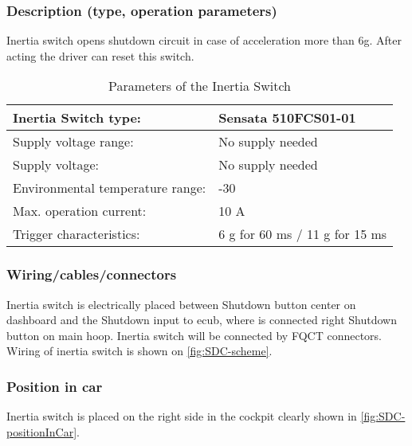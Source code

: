 \subsubsection{Description (type, operation parameters)}
\iffalse Describe the Inertia Switch used and use a table for the common operation parameters, like supply voltage, temperature, etc.
Additionally, fill out the following table replacing the values with your specification: \fi

Inertia switch opens shutdown circuit in case of acceleration more than 6g. After acting the driver can reset this switch.
\begin{table}[H]
	\centering
	\caption{Parameters of the Inertia Switch}
	\begin{tabu}{|X|l|}
	\hline	Inertia Switch type: & Sensata 510FCS01-01 \\
	\hline	Supply voltage range: & No supply needed \\
	\hline	Supply voltage: & No supply needed \\
	\hline	Environmental temperature range: & -30  \degC \\
	\hline	Max. operation current: & 10 A \\
	\hline	Trigger characteristics: & 6 g for 60 ms / 11 g for 15 ms \\
	\hline
	\end{tabu}%
	\label{tab:inertiaSwitch}%
\end{table}%


\subsubsection{Wiring/cables/connectors}

Inertia switch is electrically placed between Shutdown button center on dashboard and the Shutdown input to \gls{ecub}, where is connected right Shutdown button on main hoop. Inertia switch will be connected by FQCT connectors. Wiring of inertia switch is shown on \ref{fig:SDC-scheme}.

\subsubsection{Position in car}

Inertia switch is placed on the right side in the cockpit clearly shown in \ref{fig:SDC-positionInCar}.